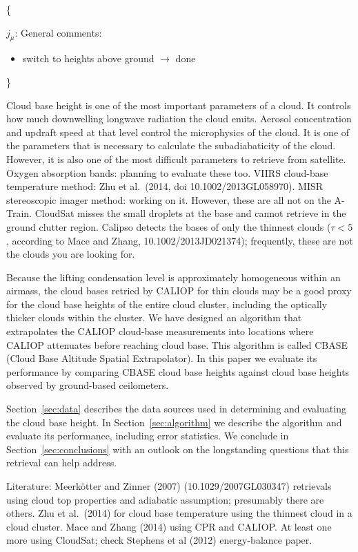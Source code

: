 \documentclass[amt,manuscript]{copernicus}\usepackage[]{graphicx}\usepackage[]{color}
\newcommand{\hlnum}[1]{\textcolor[rgb]{0.686,0.059,0.569}{#1}}%
\newcommand\comment[2]{\{\hlnum{ \textit{#1}: #2}\}}
\newcommand\commentjm[1]{\comment{$j_\mu$}{#1}}
\begin{document}
\commentjm{General comments:
  \begin{itemize}
  \item switch to heights above ground $\longrightarrow$ done
  \end{itemize}
}

\introduction  %
\label{sec:intro}
Cloud base height is one of the most important parameters of a cloud.  It
controls how much downwelling longwave radiation the cloud emits.  Aerosol
concentration and updraft speed at that level control the microphysics of the
cloud.  It is one of the parameters that is necessary to calculate the
subadiabaticity of the cloud.  However, it is also one of the most difficult
parameters to retrieve from satellite.  Oxygen absorption bands: planning to
evaluate these too.  VIIRS cloud-base temperature method: Zhu et al.~(2014, doi
10.1002/2013GL058970).  MISR stereoscopic imager method: working on it.
However, these are all not on the A-Train.  CloudSat misses the small droplets
at the base and cannot retrieve in the ground clutter region.  Calipso detects
the bases of only the thinnest clouds ($\tau < 5$, according to Mace and Zhang,
10.1002/2013JD021374); frequently, these are not the clouds you are looking for.

Because the lifting condensation level is approximately homogeneous within an
airmass, the cloud bases retried by CALIOP for thin clouds may be a good proxy
for the cloud base heights of the entire cloud cluster, including the optically
thicker clouds within the cluster.  We have designed an algorithm that
extrapolates the CALIOP cloud-base measurements into locations where CALIOP
attenuates before reaching cloud base.  This algorithm is called CBASE (Cloud
Base Altitude Spatial Extrapolator).  In this paper we evaluate its performance
by comparing CBASE cloud base heights against cloud base heights observed by
ground-based ceilometers.

Section~\ref{sec:data} describes the data sources used in determining and
evaluating the cloud base height.  In Section~\ref{sec:algorithm} we describe
the algorithm and evaluate its performance, including error statistics.  We
conclude in Section~\ref{sec:conclusions} with an outlook on the longstanding
questions that this retrieval can help address.

Literature: Meerk\"otter and Zinner (2007) (10.1029/2007GL030347) retrievals
using cloud top properties and adiabatic assumption; presumably there are
others.  Zhu et al.~(2014) for cloud base temperature using the thinnest cloud in
a cloud cluster.  Mace and Zhang (2014) using CPR and CALIOP.  At least one more
using CloudSat; check Stephens et al (2012) energy-balance paper.
\end{document}
